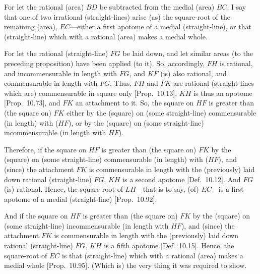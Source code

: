 \begin{Parallel}{}{}
{For let the rational (area) $BD$ be subtracted from the medial
(area) $BC$. I say that one of two irrational (straight-lines) arise (as) the square-root of the remaining (area), $EC$---either a first apotome of a medial
(straight-line), or that (straight-line) which with a rational (area) makes
a medial whole.

For let the rational (straight-line) $FG$ be laid down, and let
similar areas (to the preceding proposition) have  been applied (to it). So,
accordingly, $FH$ is rational, and incommensurable in length with
$FG$, and $KF$ (is) also rational, and commensurable
in length with $FG$. Thus, $FH$ and $FK$ are rational (straight-lines which
are) commensurable in square only [Prop.~10.13].
$KH$ is thus an apotome [Prop.~10.73], and $FK$ an attachment to it. So, the square on $HF$ is greater than (the square on)
$FK$ either by the (square) on (some straight-line) commensurable (in length)
with ($HF$), or by the (square) on (some straight-line) incommensurable
(in length with $HF$).

\centerline{}

Therefore, if the square on $HF$ is greater than (the square on) $FK$
by the (square) on (some straight-line) commensurable (in length) with ($HF$),
and (since) the attachment $FK$ is commensurable
in length with the (previously) laid down rational (straight-line) $FG$,
$KH$ is a second apotome [Def.~10.12]. 
And $FG$ (is) rational. Hence, the square-root of $LH$---that is to say, (of)
$EC$---is a first apotome of a medial (straight-line) [Prop.~10.92].

And if the square on $HF$ is greater than (the square on) $FK$
by the (square) on (some straight-line) incommensurable (in length with $HF$),
and (since) the attachment $FK$ is commensurable
in length with the (previously) laid down rational (straight-line) $FG$,
$KH$ is a fifth apotome [Def.~10.15]. Hence,
the square-root of $EC$ is that (straight-line) which with a rational (area)
makes a medial whole [Prop.~10.95]. 
(Which is) the very thing it was required to show.}
\end{Parallel}

